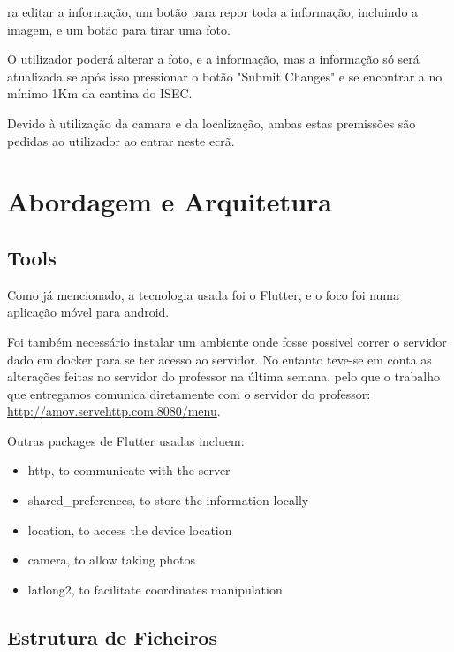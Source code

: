 \documentclass[10pt]{article}
\begin{document}
ra editar a informação, um botão para repor toda a informação, incluindo a imagem, e um botão para tirar uma foto.

    O utilizador poderá alterar a foto, e a informação, mas a informação só será atualizada se após isso pressionar o botão "Submit Changes" e se encontrar a no mínimo 1Km da cantina do ISEC.

    Devido à utilização da camara e da localização, ambas estas premissões são pedidas ao utilizador ao entrar neste ecrã.

\section{Abordagem e Arquitetura}\label{sec:3}

	\subsection{Tools}

		Como já mencionado, a tecnologia usada foi o Flutter, e o foco foi numa aplicação móvel para android.

        Foi também necessário instalar um ambiente onde fosse possivel correr o servidor dado em docker para se ter acesso ao servidor. No entanto teve-se em conta as alterações feitas no servidor do professor na última semana, pelo que o trabalho que entregamos comunica diretamente com o servidor do professor: \href{http://amov.servehttp.com:8080/menu}{http://amov.servehttp.com:8080/menu}.

        Outras packages de Flutter\cite{1} usadas incluem:

        \begin{itemize}
		\item http, to communicate with the server
		\item shared\_preferences, to store the information locally
		\item location, to access the device location
		\item camera, to allow taking photos
            \item latlong2, to facilitate coordinates manipulation
	\end{itemize}

    \pagebreak

        \subsection{Estrutura de Ficheiros}
\end{document}
